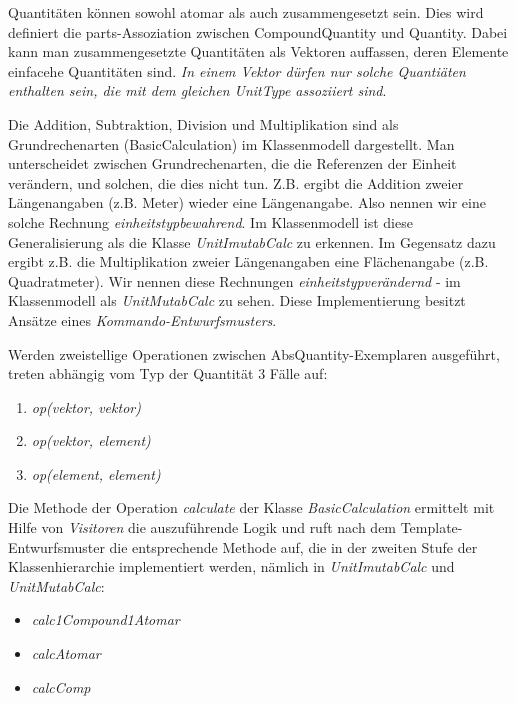 Quantitäten können sowohl atomar als auch zusammengesetzt sein.
Dies wird definiert die parts-Assoziation zwischen CompoundQuantity und Quantity. Dabei kann man zusammengesetzte Quantitäten als Vektoren auffassen, deren Elemente einfacehe Quantitäten sind. \emph{In einem Vektor dürfen nur solche Quantiäten enthalten sein, die mit dem gleichen UnitType assoziiert sind}. 

\label{Berechnungen}

Die Addition, Subtraktion, Division und Multiplikation sind als Grundrechenarten (BasicCalculation) im Klassenmodell dargestellt. Man unterscheidet zwischen Grundrechenarten, die die Referenzen der Einheit verändern, und solchen, die dies nicht tun. Z.B. ergibt die Addition zweier Längenangaben (z.B. Meter) wieder eine Längenangabe. Also nennen wir eine solche Rechnung \emph{einheitstypbewahrend}. Im Klassenmodell ist diese Generalisierung als die Klasse \textit{UnitImutabCalc} zu erkennen. Im Gegensatz dazu ergibt z.B. die Multiplikation zweier Längenangaben eine Flächenangabe (z.B. Quadratmeter). Wir nennen diese Rechnungen \emph{einheitstypverändernd} - im Klassenmodell als \textit{UnitMutabCalc} zu sehen. Diese Implementierung besitzt Ansätze eines \emph{Kommando-Entwurfsmusters}.


Werden zweistellige Operationen zwischen AbsQuantity-Exemplaren ausgeführt, treten abhängig vom Typ der Quantität 3 Fälle auf:
\begin{enumerate}
\item \textit{op(vektor, vektor)}
\item \textit{op(vektor, element)}
\item \textit{op(element, element)}
\end{enumerate}

Die Methode der Operation \textit{calculate} der Klasse \textit{BasicCalculation} ermittelt mit Hilfe von \emph{Visitoren} die auszuführende Logik und ruft nach dem Template-Entwurfsmuster die entsprechende Methode auf, die in der zweiten Stufe der Klassenhierarchie implementiert werden, nämlich in \textit{UnitImutabCalc} und \textit{UnitMutabCalc}:
\begin{itemize}
\item \textit{calc1Compound1Atomar}
\item \textit{calcAtomar}
\item \textit{calcComp}
\end{itemize}

